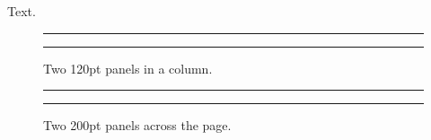 \documentclass[twocolumn]{article}
\begin{document}
Text.
\begin{figure}
\centering
\rule{120pt}{1cm}\hspace{4pt}\rule{120pt}{1cm}
\caption{Two 120pt panels in a column.}
\end{figure}
\begin{figure}
\centering
\rule{200pt}{1cm}\hspace{4pt}\rule{200pt}{1cm}
\caption{Two 200pt panels across the page.}
\end{figure}
\end{document}
